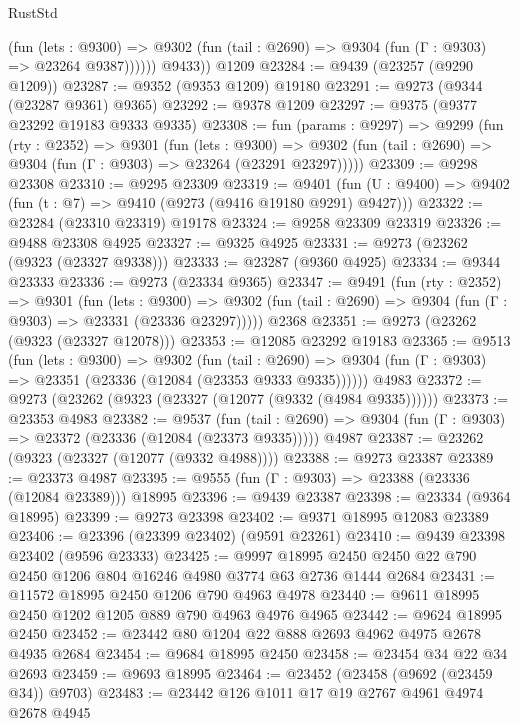 \begin{lexlean}{RustStd}
\begin{coremodule}
              (fun (lets : @9300) =>
              @9302 (fun (tail : @2690) => @9304 (fun (Γ : @9303) => @23264 @9387))))))
        @9433))
    @1209
@23284 := @9439 (@23257 (@9290 @1209))
@23287 := @9352 (@9353 @1209) @19180
@23291 := @9273 (@9344 (@23287 @9361) @9365)
@23292 := @9378 @1209
@23297 := @9375 (@9377 @23292 @19183 @9333 @9335)
@23308 := fun (params : @9297) =>
  @9299
    (fun (rty : @2352) =>
    @9301
      (fun (lets : @9300) =>
      @9302 (fun (tail : @2690) => @9304 (fun (Γ : @9303) => @23264 (@23291 @23297)))))
@23309 := @9298 @23308
@23310 := @9295 @23309
@23319 := @9401
    (fun (U : @9400) => @9402 (fun (t : @7) => @9410 (@9273 (@9416 @19180 @9291) @9427)))
@23322 := @23284 (@23310 @23319) @19178
@23324 := @9258 @23309 @23319
@23326 := @9488 @23308 @4925
@23327 := @9325 @4925
@23331 := @9273 (@23262 (@9323 (@23327 @9338)))
@23333 := @23287 (@9360 @4925)
@23334 := @9344 @23333
@23336 := @9273 (@23334 @9365)
@23347 := @9491
    (fun (rty : @2352) =>
    @9301
      (fun (lets : @9300) =>
      @9302 (fun (tail : @2690) => @9304 (fun (Γ : @9303) => @23331 (@23336 @23297)))))
    @2368
@23351 := @9273 (@23262 (@9323 (@23327 @12078)))
@23353 := @12085 @23292 @19183
@23365 := @9513
    (fun (lets : @9300) =>
    @9302
      (fun (tail : @2690) =>
      @9304 (fun (Γ : @9303) => @23351 (@23336 (@12084 (@23353 @9333 @9335))))))
    @4983
@23372 := @9273 (@23262 (@9323 (@23327 (@12077 (@9332 (@4984 @9335))))))
@23373 := @23353 @4983
@23382 := @9537
    (fun (tail : @2690) => @9304 (fun (Γ : @9303) => @23372 (@23336 (@12084 (@23373 @9335)))))
    @4987
@23387 := @23262 (@9323 (@23327 (@12077 (@9332 @4988))))
@23388 := @9273 @23387
@23389 := @23373 @4987
@23395 := @9555 (fun (Γ : @9303) => @23388 (@23336 (@12084 @23389))) @18995
@23396 := @9439 @23387
@23398 := @23334 (@9364 @18995)
@23399 := @9273 @23398
@23402 := @9371 @18995 @12083 @23389
@23406 := @23396 (@23399 @23402) (@9591 @23261)
@23410 := @9439 @23398 @23402 (@9596 @23333)
@23425 := @9997
    @18995
    @2450
    @2450
    @22
    @790
    @2450
    @1206
    @804
    @16246
    @4980
    @3774
    @63
    @2736
    @1444
    @2684
@23431 := @11572 @18995 @2450 @1206 @790 @4963 @4978
@23440 := @9611 @18995 @2450 @1202 @1205 @889 @790 @4963 @4976 @4965
@23442 := @9624 @18995 @2450
@23452 := @23442 @80 @1204 @22 @888 @2693 @4962 @4975 @2678 @4935 @2684
@23454 := @9684 @18995 @2450
@23458 := @23454 @34 @22 @34 @2693
@23459 := @9693 @18995
@23464 := @23452 (@23458 (@9692 (@23459 @34)) @9703)
@23483 := @23442
    @126
    @1011
    @17
    @19
    @2767
    @4961
    @4974
    @2678
    @4945

\end{coremodule}
\end{lexlean}
